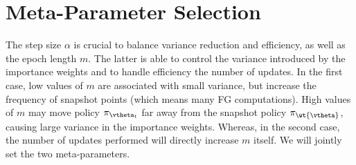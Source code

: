 \section{Meta-Parameter Selection}\label{sec:stopping}
\vspace{-0.05in}
The step size $\alpha$ is crucial to balance variance reduction and efficiency, as well as
the epoch length $m$. The latter is able to control the variance introduced by the importance weights and to handle efficiency \wrt the number of updates. In the first case, low values of $m$ are associated with small variance, but increase the frequency of snapshot points (which means many \acs{FG} computations). High values of $m$ may move policy $\pi_{\vtheta_t}$ far away from the snapshot policy $\pi_{\wt{\vtheta}}$, causing large variance in the importance weights. Whereas, in the second case, the number of updates performed will directly increase \wrt $m$ itself. We will jointly set the two meta-parameters.

